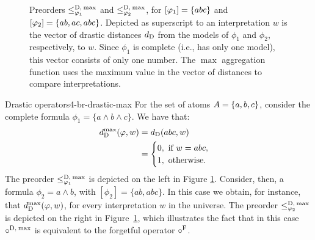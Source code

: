 \begin{figure}
		\caption{
			Preorders $\le^{{\operatorname{D}},\:{\operatorname{max}}}_{\varphi_1}$ and $\le^{{\operatorname{D}},\:{\operatorname{max}}}_{\varphi_2}$,
			for $[\varphi_1]=\{{abc}\}$ and $[\varphi_2]=\{{ab, ac, abc}\}$.
			Depicted as superscript to an interpretation $w$ is the vector of drastic distances $d_{\operatorname{D}}$ 
			from the models of $\phi_1$ and $\phi_2$, respectively, to $w$.
			Since $\phi_1$ is complete (i.e., has only one model), this vector consists of only one number.
			The $\max$ aggregation function uses the maximum value in the vector of distances to compare interpretations.
			}
	\label{fig:4-br-drastic-max}
\end{figure}

\begin{xmpl}{Drastic operators}{4-br-drastic-max}
	For the set of atoms $A=\{a,b,c\}$,
	consider the complete formula 
	$\phi_1 = \{a\land b\land c\}$.
	We have that:
	\begin{align*}
		d^{\operatorname{max}}_{\operatorname{D}}(\varphi,w) &=d_{\operatorname{D}}(abc,w)\\
									&=\begin{cases}
										0,~\text{if}~w=abc,\\
										1,~\text{otherwise}.
									\end{cases}
	\end{align*}
	The preorder $\le_{\varphi_1}^{{\operatorname{D}},\:{\operatorname{max}}}$ is depicted on the left in
	Figure \ref{fig:4-br-drastic-max}.
	Consider, then, a formula
	$\phi_2 = a\land b$,
	with $[\phi_2]=\{ab, abc\}$.
	In this case we obtain, for instance, that
	$d^{\operatorname{max}}_{\operatorname{D}}(\varphi,w)$, for every interpretation $w$ in the universe.
	The preorder $\le_{\varphi_2}^{{\operatorname{D}},\:{\operatorname{max}}}$ is depicted on the right in
	Figure~\ref{fig:4-br-drastic-max},
	which illustrates the fact that in this case $\circ^{{\operatorname{D}},\:{\operatorname{max}}}$ is equivalent to 
	the forgetful operator $\circ^{\mathrm{F}}$.
\end{xmpl}

